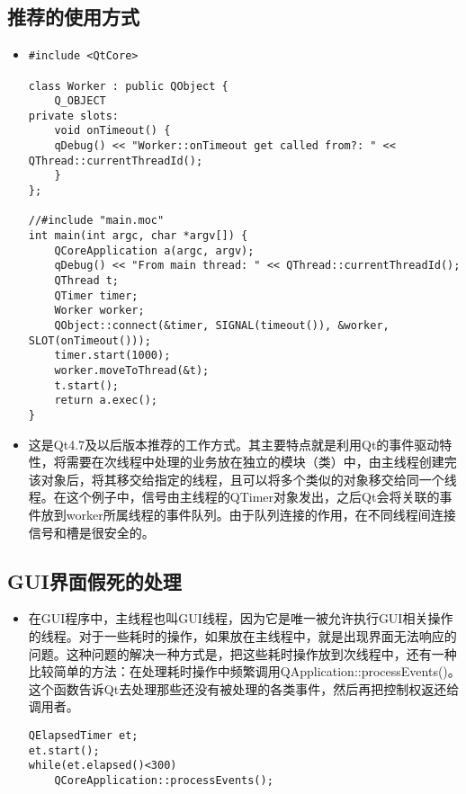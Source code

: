 \documentclass[9pt,b5paper]{article}
\begin{document}
\subsection{推荐的使用方式}
\label{sec-5-3}
\begin{itemize}
\item \lstset{language=java,label= ,caption= ,numbers=none}
\begin{lstlisting}
#include <QtCore>

class Worker : public QObject {
    Q_OBJECT
private slots:
    void onTimeout() {
	qDebug() << "Worker::onTimeout get called from?: " << QThread::currentThreadId();
    }
};

//#include "main.moc"
int main(int argc, char *argv[]) {
    QCoreApplication a(argc, argv);
    qDebug() << "From main thread: " << QThread::currentThreadId();
    QThread t;
    QTimer timer;
    Worker worker;
    QObject::connect(&timer, SIGNAL(timeout()), &worker, SLOT(onTimeout()));
    timer.start(1000);
    worker.moveToThread(&t);
    t.start();
    return a.exec();
}
\end{lstlisting}
\item 这是Qt4.7及以后版本推荐的工作方式。其主要特点就是利用Qt的事件驱动特性，将需要在次线程中处理的业务放在独立的模块（类）中，由主线程创建完该对象后，将其移交给指定的线程，且可以将多个类似的对象移交给同一个线程。在这个例子中，信号由主线程的QTimer对象发出，之后Qt会将关联的事件放到worker所属线程的事件队列。由于队列连接的作用，在不同线程间连接信号和槽是很安全的。
\end{itemize}
\subsection{GUI界面假死的处理}
\label{sec-5-4}
\begin{itemize}
\item 在GUI程序中，主线程也叫GUI线程，因为它是唯一被允许执行GUI相关操作的线程。对于一些耗时的操作，如果放在主线程中，就是出现界面无法响应的问题。这种问题的解决一种方式是，把这些耗时操作放到次线程中，还有一种比较简单的方法：在处理耗时操作中频繁调用QApplication::processEvents()。这个函数告诉Qt去处理那些还没有被处理的各类事件，然后再把控制权返还给调用者。

\lstset{language=java,label= ,caption= ,numbers=none}
\begin{lstlisting}
QElapsedTimer et;
et.start();
while(et.elapsed()<300)
    QCoreApplication::processEvents();
\end{lstlisting}
\end{itemize}
\end{document}
